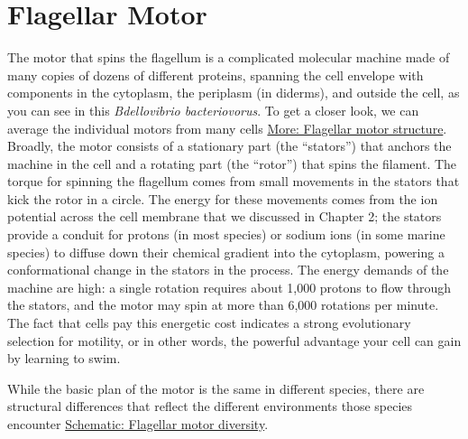 \documentclass[]{tufte-book}
\begin{document}
\section{Flagellar Motor}\label{flagellar-motor}

The motor that spins the flagellum is a complicated molecular machine
made of many copies of dozens of different proteins, spanning the cell
envelope with components in the cytoplasm, the periplasm (in diderms),
and outside the cell, as you can see in this \emph{Bdellovibrio
bacteriovorus}. To get a closer look, we can average the individual
motors from many cells
\protect\hyperlink{Flagellar_motor_structure}{More: Flagellar motor
structure}. Broadly, the motor consists of a stationary part (the
``stators'') that anchors the machine in the cell and a rotating part
(the ``rotor'') that spins the filament. The torque for spinning the
flagellum comes from small movements in the stators that kick the rotor
in a circle. The energy for these movements comes from the ion potential
across the cell membrane that we discussed in Chapter 2; the stators
provide a conduit for protons (in most species) or sodium ions (in some
marine species) to diffuse down their chemical gradient into the
cytoplasm, powering a conformational change in the stators in the
process. The energy demands of the machine are high: a single rotation
requires about 1,000 protons to flow through the stators, and the motor
may spin at more than 6,000 rotations per minute. The fact that cells
pay this energetic cost indicates a strong evolutionary selection for
motility, or in other words, the powerful advantage your cell can gain
by learning to swim.

While the basic plan of the motor is the same in different species,
there are structural differences that reflect the different environments
those species encounter
\protect\hyperlink{Flagellar_motor_diversity}{Schematic: Flagellar motor
diversity}.
\end{document}
